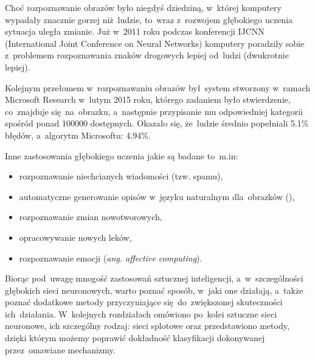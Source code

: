 Choć rozpoznawanie obrazów było niegdyś dziedziną, w~której komputery wypadały
znacznie gorzej niż~ludzie, to~wraz z~rozwojem głębokiego uczenia sytuacja
uległa zmianie. Już w~2011 roku podczas konferencji IJCNN (International Joint
Conference on Neural Networks) komputery poradziły sobie z~problemem
rozpoznawania znaków drogowych lepiej od~ludzi (dwukrotnie lepiej).

Kolejnym przełomem w~rozpoznawaniu obrazów był~system stworzony w~ramach
Microsoft Research w~lutym 2015 roku, którego zadaniem było stwierdzenie,
co~znajduje się~na~obrazku, a~następnie przypisanie mu odpowiedniej kategorii spośród
ponad 100000 dostępnych. Okazało się, że~ludzie średnio popełniali 5.1\% błędów,
a~algorytm Microsoftu: 4.94\%.

\begin{minipage}[t]{\textwidth}
    Inne zastosowania głębokiego uczenia jakie są badane to~m.in:
    \begin{itemize}
      \item rozpoznawanie niechcianych wiadomości (tzw. spamu),
      \item automatyczne generowanie opisów w~języku naturalnym dla~obrazków (\cite{img-desc-generator}),
      \item rozpoznawanie zmian nowotworowych,
      \item opracowywanie nowych leków,
      \item rozpoznawanie emocji (\textit{ang. affective computing}).
    \end{itemize}
\end{minipage}

Biorąc pod~uwagę mnogość zastosowań sztucznej inteligencji, a~w~szczególności głębokich sieci neuronowych, warto
poznać sposób, w~jaki one działają, a~także poznać dodatkowe metody przyczyniające się~do~zwiększonej skuteczności
ich~działania. W~kolejnych rozdziałach omówiono po~kolei sztuczne sieci neuronowe, ich szczególny rodzaj: sieci
splotowe oraz przedstawiono metody, dzięki którym możemy poprawić dokładność klasyfikacji dokonywanej przez~omawiane
mechanizmy.

